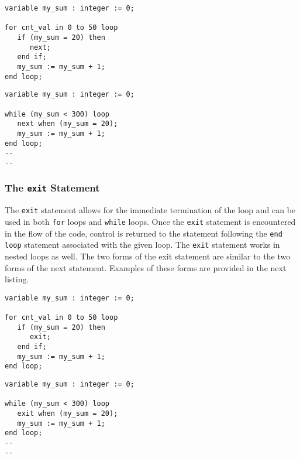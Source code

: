\vspace{10pt}
\noindent
\begin{minipage}{0.5\linewidth}
\begin{lstlisting}
variable my_sum : integer := 0; 

for cnt_val in 0 to 50 loop
   if (my_sum = 20) then 
      next; 
   end if; 
   my_sum := my_sum + 1; 
end loop;
\end{lstlisting}
\end{minipage}
\noindent
\begin{minipage}{0.5\linewidth}
\begin{lstlisting}
variable my_sum : integer := 0; 

while (my_sum < 300) loop
   next when (my_sum = 20); 
   my_sum := my_sum + 1; 
end loop; 
--
--
\end{lstlisting}
\end{minipage}

\subsubsection{The \texttt{exit} Statement}
The \texttt{exit} statement allows for the immediate termination of the loop and can be used in both \texttt{for} loops and \texttt{while} loops. Once the \texttt{exit} statement is encountered in the flow of the code, control is returned to the statement following the \texttt{end loop} statement associated with the given loop. The \texttt{exit} statement works in nested loops as well. The two forms of the exit statement are similar to the two forms of the next statement. Examples of these forms are provided in the next listing.

\vspace{10pt}
\noindent
\begin{minipage}{0.5\linewidth}
\begin{lstlisting}
variable my_sum : integer := 0; 

for cnt_val in 0 to 50 loop
   if (my_sum = 20) then 
      exit; 
   end if; 
   my_sum := my_sum + 1; 
end loop; 
\end{lstlisting}
\end{minipage}
\noindent
\begin{minipage}{0.5\linewidth}
\begin{lstlisting}
variable my_sum : integer := 0; 

while (my_sum < 300) loop
   exit when (my_sum = 20); 
   my_sum := my_sum + 1; 
end loop; 
--
--
\end{lstlisting}
\end{minipage} 
